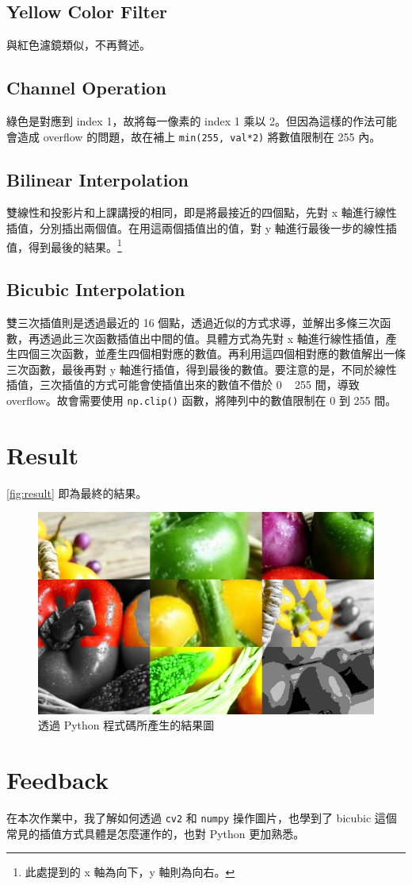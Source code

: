 \documentclass[twocolumn]{extarticle}
\begin{document}
\subsection{Yellow Color Filter}

與紅色濾鏡類似，不再贅述。

\subsection{Channel Operation}

綠色是對應到 index 1，故將每一像素的 index 1 乘以 2。但因為這樣的作法可能會造成 overflow 的問題，故在補上 \texttt{min(255, val*2)} 將數值限制在 255 內。

\subsection{Bilinear Interpolation}

雙線性和投影片和上課講授的相同，即是將最接近的四個點，先對 x 軸進行線性插值，分別插出兩個值。在用這兩個插值出的值，對 y 軸進行最後一步的線性插值，得到最後的結果。\footnote{此處提到的 x 軸為向下，y 軸則為向右。}

\subsection{Bicubic Interpolation}

雙三次插值則是透過最近的 16 個點，透過近似的方式求導，並解出多條三次函數，再透過此三次函數插值出中間的值。具體方式為先對 x 軸進行線性插值，產生四個三次函數，並產生四個相對應的數值。再利用這四個相對應的數值解出一條三次函數，最後再對 y 軸進行插值，得到最後的數值。要注意的是，不同於線性插值，三次插值的方式可能會使插值出來的數值不借於 0 ~ 255 間，導致 overflow。故會需要使用 \texttt{np.clip()} 函數，將陣列中的數值限制在 0 到 255 間。


\section{Result}

\autoref{fig:result} 即為最終的結果。

\begin{figure}[H]
	\centering
	\includegraphics[width=0.9\linewidth]{../result}
	\caption{透過 Python 程式碼所產生的結果圖}
	\label{fig:result}
\end{figure}


\section{Feedback}

在本次作業中，我了解如何透過 \texttt{cv2} 和 \texttt{numpy} 操作圖片，也學到了 bicubic 這個常見的插值方式具體是怎麼運作的，也對 Python 更加熟悉。
\end{document}
